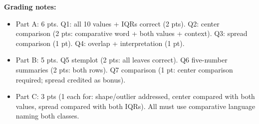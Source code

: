 \documentclass[10pt]{article}
\begin{document}
\begin{teachernote}
\textbf{Grading notes:}
\begin{itemize}[itemsep=2pt]
  \item Part A: 6 pts. Q1: all 10 values + IQRs correct (2 pts). Q2: center comparison (2 pts: comparative word + both values + context). Q3: spread comparison (1 pt). Q4: overlap + interpretation (1 pt).
  \item Part B: 5 pts. Q5 stemplot (2 pts: all leaves correct). Q6 five-number summaries (2 pts: both rows). Q7 comparison (1 pt: center comparison required; spread credited as bonus).
  \item Part C: 3 pts (1 each for: shape/outlier addressed, center compared with both values, spread compared with both IQRs). All must use comparative language naming both classes.
\end{itemize}
\end{teachernote}
\end{document}
